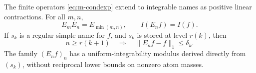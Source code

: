 \begin{theorem}
\label{thm:m-filtration}
The finite operators \eqref{eq:m-condexp} extend to integrable names as
positive linear contractions.  For all $m,n$,
\begin{equation}
 E_mE_n=E_{\min(m,n)},\qquad I(E_nf)=I(f).
 \label{eq:m-tower}
\end{equation}
If $s_k$ is a regular simple name for $f$, and $s_k$ is stored at level
$r(k)$, then
\begin{equation}
 n\ge r(k+1)\quad\Longrightarrow\quad
 \|E_nf-f\|_1\le\delta_k.
 \label{eq:m-upward-rate}
\end{equation}
The family $(E_nf)_n$ has a uniform-integrability modulus derived directly
from $(s_k)$, without reciprocal lower bounds on nonzero atom masses.
\end{theorem}

